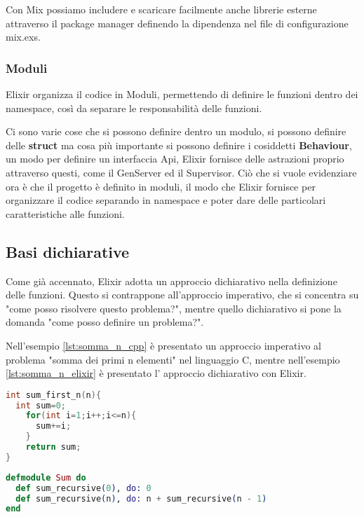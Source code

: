 Con Mix possiamo includere e scaricare facilmente anche librerie esterne attraverso
il package manager definendo la dipendenza nel file di configurazione
mix.exs.\cite{HexDocs99:online}

\subsubsection{Moduli}
Elixir organizza il codice in Moduli, permettendo di definire
le funzioni dentro dei namespace, così da separare
le responsabilità delle funzioni.

Ci sono varie cose che si possono definire dentro un modulo,
si possono definire delle \textbf{struct}
ma cosa più importante si possono definire i cosiddetti 
\textbf{Behaviour}, un modo per definire un interfaccia Api,
Elixir fornisce delle astrazioni proprio attraverso questi,
come il GenServer ed il Supervisor.
Ciò che si vuole evidenziare ora è che il progetto è definito
in moduli, il modo che Elixir fornisce per organizzare il
codice separando in namespace e poter dare delle particolari
caratteristiche alle funzioni.


\subsection{Basi dichiarative}

Come già accennato, Elixir adotta un approccio
dichiarativo nella definizione delle funzioni.
Questo si contrappone all'approccio imperativo,
che si concentra su "come posso risolvere questo problema?",
mentre quello dichiarativo si pone la domanda 
"come posso definire un problema?".

Nell'esempio \ref{lst:somma_n_cpp} è presentato un approccio
imperativo al problema "somma dei primi n elementi" nel linguaggio C,
mentre nell'esempio \ref{lst:somma_n_elixir} è presentato 
l' approccio dichiarativo con Elixir.


\begin{lstlisting}[language=cpp, caption={Somma N elementi},captionpos=b,
	label={lst:somma_n_cpp}]
int sum_first_n(n){
  int sum=0;
    for(int i=1;i++;i<=n){
      sum+=i;
    }
    return sum;
}
\end{lstlisting}

\begin{lstlisting}[language=elixir, caption={Somma N elementi},captionpos=b,
	label={lst:somma_n_elixir}]
defmodule Sum do
  def sum_recursive(0), do: 0
  def sum_recursive(n), do: n + sum_recursive(n - 1)
end
\end{lstlisting}

